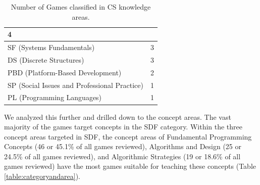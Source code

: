 \documentclass{sig-alternate-05-2015}
\begin{document}
\begin{table}[tb]
\begin{tabularx}{\linewidth}{|X|r|}
4\\ \hline


SF (Systems Fundamentals)&


3\\ \hline


DS (Discrete Structures)&


3\\ \hline


PBD (Platform-Based Development)&


2\\ \hline


SP (Social Issues and Professional Practice)&


1\\ \hline


PL (Programming Languages)&


1\\ \hline
\end{tabularx}
\caption{Number of Games classified in CS knowledge areas.}
\label{table:knowledgearea}
\end{table}




We analyzed this further and drilled down to the concept areas. The vast majority of the games target concepts in the SDF category. Within the three concept areas targeted in SDF, the concept areas of Fundamental Programming Concepts (46 or 45.1\% of all games reviewed), Algorithms and Design (25 or 24.5\% of all games reviewed), and Algorithmic Strategies (19 or 18.6\% of all games reviewed) have the most games suitable for teaching these concepts (Table \ref{table:categoryandarea}).
\end{document}
